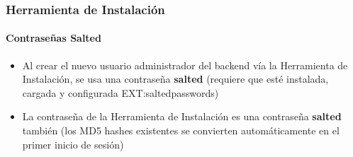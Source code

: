 \begin{frame}[fragile]
\end{frame}


\begin{frame}[fragile]
	\frametitle{Herramienta de Instalación}
	\framesubtitle{Contraseñas Salted}

	\begin{itemize}
		\item Al crear el nuevo usuario administrador del backend vía la Herramienta de Instalación, se usa una contraseña \textbf{salted}\newline
			\smaller(requiere que esté instalada, cargada y configurada EXT:saltedpasswords)\normalsize
		\item La contraseña de la Herramienta de Instalación es una contraseña \textbf{salted} también
			\smaller(los MD5 hashes existentes se convierten automáticamente en el primer inicio de sesión)\normalsize
	\end{itemize}


\end{frame}
